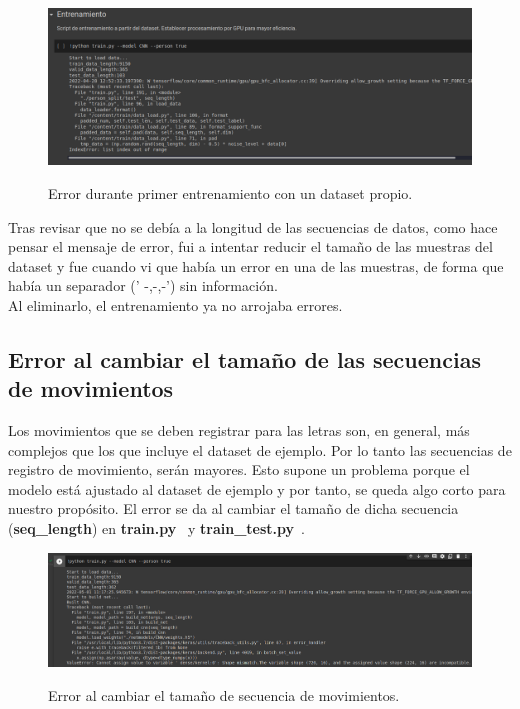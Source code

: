 \begin{figure}[h]
    \centering
    \includegraphics[width=1\textwidth]{capturas/ErrorEntrenamiento.png}\\[-0,40cm]
    \caption{Error durante primer entrenamiento con un dataset propio.}
    \end{figure}

Tras revisar que no se debía a la longitud de las secuencias de datos,
como hace pensar el mensaje de error, fui a intentar reducir el tamaño de las
muestras del dataset y fue cuando vi que había un error en una de las muestras,
de forma que había un separador (' -,-,-') sin información.\\
Al eliminarlo, el entrenamiento ya no arrojaba errores.


\subsection{Error al cambiar el tamaño de las secuencias de movimientos}
Los movimientos que se deben registrar para las letras son, en general, más complejos
que los que incluye el dataset de ejemplo. Por lo tanto las secuencias de registro
de movimiento, serán mayores. Esto supone un problema porque el modelo está ajustado
al dataset de ejemplo y por tanto, se queda algo corto para nuestro propósito.
El error se da al cambiar el tamaño de dicha secuencia
(\small\textbf{seq\_length}\normalsize) en \small\textbf{train.py}\normalsize~ y
\small\textbf{train\_test.py}\normalsize~.

\begin{figure}[h]
    \centering
    \includegraphics[width=1\textwidth]{capturas/ErrorTamanioSecuencias.png}\\[-0,40cm]
    \caption{Error al cambiar el tamaño de secuencia de movimientos.}
    \end{figure}

